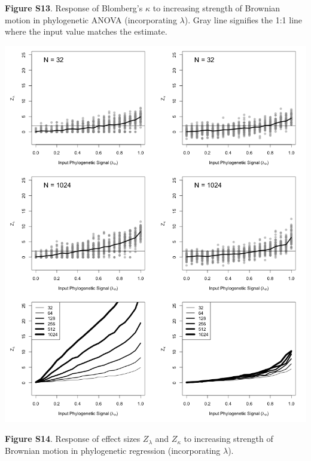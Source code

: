 \documentclass[
]{article}
\begin{document}
\textbf{Figure S13}. Response of Blomberg's \(\kappa\) to increasing
strength of Brownian motion in phylogenetic ANOVA (incorporating
\(\lambda\)). Gray line signifies the 1:1 line where the input value
matches the estimate.

\includegraphics[width=0.95\linewidth]{fig.S14}

\textbf{Figure S14}. Response of effect sizes \(Z_{\lambda}\) and
\(Z_{\kappa}\) to increasing strength of Brownian motion in phylogenetic
regression (incorporating \(\lambda\)).
\end{document}
